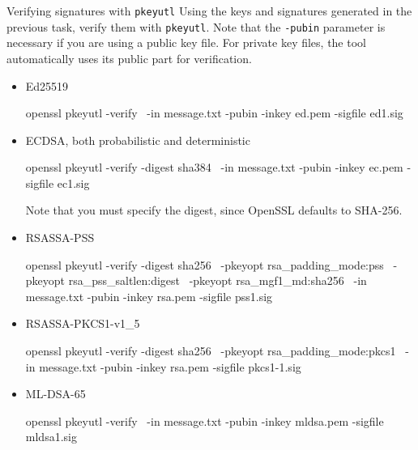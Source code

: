 \documentclass{practice}
\begin{document}
\begin{task}{Verifying signatures with \texttt{pkeyutl}}
  Using the keys and signatures generated in the previous task, verify them with \texttt{pkeyutl}.
  Note that the \texttt{-pubin} parameter is necessary if you are using a public key file.
  For private key files, the tool automatically uses its public part for verification.

  \begin{itemize}
    \item Ed25519
    \begin{cmdblock}
openssl pkeyutl -verify \
  -in message.txt -pubin -inkey ed.pem -sigfile ed1.sig
    \end{cmdblock}

    \item ECDSA, both probabilistic and deterministic
    \begin{cmdblock}
openssl pkeyutl -verify -digest sha384 \
  -in message.txt -pubin -inkey ec.pem -sigfile ec1.sig
    \end{cmdblock}

    Note that you must specify the digest, since OpenSSL defaults to SHA-256.

    \item RSASSA-PSS
    \begin{cmdblock}
openssl pkeyutl -verify -digest sha256 \
  -pkeyopt rsa_padding_mode:pss \
  -pkeyopt rsa_pss_saltlen:digest \
  -pkeyopt rsa_mgf1_md:sha256 \
  -in message.txt -pubin -inkey rsa.pem -sigfile pss1.sig
    \end{cmdblock}

    \item RSASSA-PKCS1-v1\_5
    \begin{cmdblock}
openssl pkeyutl -verify -digest sha256 \
  -pkeyopt rsa_padding_mode:pkcs1 \
  -in message.txt -pubin -inkey rsa.pem -sigfile pkcs1-1.sig
    \end{cmdblock}

    \item ML-DSA-65
    \begin{cmdblock}
openssl pkeyutl -verify \
  -in message.txt -pubin -inkey mldsa.pem -sigfile mldsa1.sig
    \end{cmdblock}
  \end{itemize}
\end{task}
\end{document}
